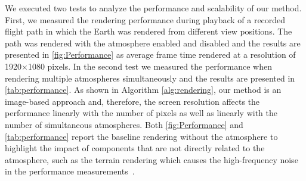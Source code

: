 \documentclass[journal]{vgtc}                %
\newcommand{\review}[1]{{\color{blue}#1}}
\begin{document}

\review{
We executed two tests to analyze the performance and scalability of our method.
First, we measured the rendering performance during playback of a recorded flight path in which the Earth was rendered from different view positions. The path was rendered with the atmosphere enabled and disabled and the results are presented in \autoref{fig:Performance} as average frame time rendered at a resolution of 1920$\times$1080 pixels.
In the second test we measured the performance when rendering multiple atmospheres simultaneously and the results are presented in \autoref{tab:performance}. As shown in Algorithm \autoref{alg:rendering}, our method is an image-based approach and, therefore, the screen resolution affects the performance linearly with the number of pixels as well as linearly with the number of simultaneous atmospheres. Both \autoref{fig:Performance} and \autoref{tab:performance} report the baseline rendering without the atmosphere to highlight the impact of components that are not directly related to the atmosphere, %
such as the terrain rendering which causes the high-frequency noise in the performance measurements~\cite{bladin17globe}. 

%
}

\end{document}
